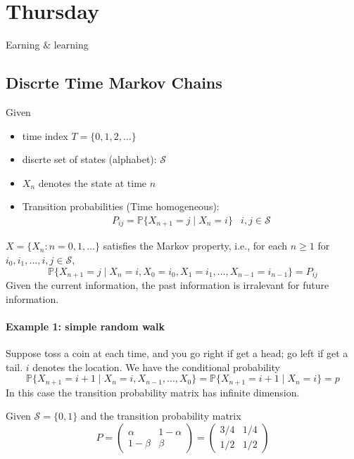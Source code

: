 

\section{Thursday}
Earning $\&$ learning
\subsection{Discrte Time Markov Chains}
Given 
\begin{itemize}
\item
time index $T=\{0,1,2,\dots\}$
\item
discrte set of states (alphabet): $\mathcal{S}$
\item
$X_n$ denotes the state at time $n$
\item
Transition probabilities (Time homogeneous):
\[
\begin{array}{ll}
P_{ij} = \mathbb{P}\{X_{n+1} = j\mid X_n = i\}
&
i,j\in\mathcal{S}
\end{array}
\]
\end{itemize}
$X = \{X_n: n=0,1,\dots\}$ satisfies the Markov property, i.e., for each $n\ge 1$ for $i_0,i_1,\dots,i,j\in\mathcal{S}$,
\[
\mathbb{P}\{X_{n+1} = j\mid X_n = i, X_0 = i_0,X_1 = i_1,\dots,X_{n-1} = i_{n-1}\}  = P_{ij}
\]
Given the current information, the past information is irralevant for future information.

\paragraph{Example 1: simple random walk}
Suppose toss a coin at each time, and you go right if get a head; go left if get a tail. $i$ denotes the location. We have the conditional probability
\[
\mathbb{P}\{X_{n+1}=i+1\mid X_n = i,X_{n-1},\dots,X_0\}
=
\mathbb{P}\{X_{n+1}=i+1\mid X_n = i\}=p
\]
In this case the transition probability matrix has infinite dimension. 

Given $\mathcal{S}=\{0,1\}$ and the transition probability matrix
\[
P=\begin{pmatrix}
\alpha&1-\alpha\\1 - \beta&\beta
\end{pmatrix}=\begin{pmatrix}
3/4&1/4\\1/2&1/2
\end{pmatrix}
\]


